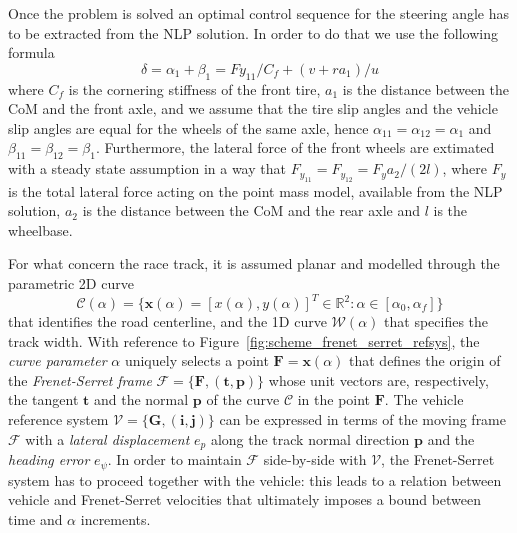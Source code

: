 \documentclass[conference]{IEEEtran} %
\renewcommand{\vec}[1]{\boldsymbol{#1}}
\begin{document}
Once the problem is solved an optimal control sequence for the steering angle has to be extracted from the NLP solution. In order to do that we use the following formula
\begin{equation}
\delta = \alpha_{1} + \beta_1 = Fy_{11}/C_f + (v + ra_1)/u
\end{equation}
where $C_f$ is the cornering stiffness of the front tire, $a_1$ is the distance between the CoM and the front axle, and we assume that the tire slip angles and the vehicle slip angles are equal for the wheels of the same axle, hence $\alpha_{11} = \alpha_{12} = \alpha_{1}$ and  $\beta_{11} = \beta_{12} = \beta_{1}$.
Furthermore, the lateral force of the front wheels are extimated with a steady state assumption in a way that $F_{y_{11}} = F_{y_{12}} = F_{y}a_2/(2l)$, where $F_{y}$ is the total lateral force acting on the point mass model, available from the NLP solution, $a_2$ is the distance between the CoM and the rear axle and $l$ is the wheelbase.



For what concern the race track, it is assumed planar and modelled through the parametric 2D curve
\begin{equation}
\mathcal C(\alpha) = \{ \vec x (\alpha) = [x(\alpha), y(\alpha)]^T \in \mathbb{R}^2 : \alpha \in [\alpha_0, \alpha_f] \}
\end{equation}
%
that identifies the road centerline, and the 1D curve $\mathcal W(\alpha)$ that specifies the track width.
With reference to Figure~\ref{fig:scheme_frenet_serret_refsys}, the \emph{curve parameter} $\alpha$ uniquely selects a point $\vec F = \vec x(\alpha)$ that defines the origin of the \emph{Frenet-Serret frame} $\mathcal F = \{ \vec F, (\vec t, \vec p) \}$ whose unit vectors are, respectively, the tangent $\vec t$ and the normal $\vec p$ of the curve $\mathcal C$ in the point $\vec F$.
%
The vehicle reference system $\mathcal V = \{ \vec G, (\vec i, \vec j) \}$ can be expressed in terms of the moving frame $\mathcal F$ with a \emph{lateral displacement} $e_p$ along the track normal direction $\vec p$ and the \emph{heading error} $e_\psi$.
In order to maintain $\mathcal F$ side-by-side with $\mathcal V$, the Frenet-Serret system has to proceed together with the vehicle: this leads to a relation between vehicle and Frenet-Serret velocities that ultimately imposes a bound between time and $\alpha$ increments.
\end{document}
